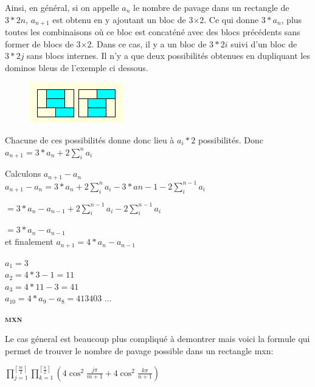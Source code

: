 \documentclass{article}
\begin{document}
Ainsi, en général, si on appelle $a_{n}$ le nombre de pavage dans un rectangle de $3*2n$, $a_{n+1}$ est obtenu en y ajoutant un bloc de 3×2.
Ce qui donne $3*a_{n}$, plus toutes les combinaisons où ce bloc est concaténé avec des blocs précédents sans former de blocs de 3×2.
Dans ce cas, il y a un bloc de $3*2i$ suivi d'un bloc de $3*2j$ sans blocs internes. Il n'y a que deux possibilités obtenues en dupliquant les dominos bleus de l'exemple ci dessous.

\begin{figure} [!h]
    \center
    \includegraphics [scale=0.7] {image/pavage-3x6_bleu.png}
\end{figure}

Chacune de ces possibilités donne donc lieu à $a_{i}*2$ possibilités.
Donc $a_{n+1} = 3*a_{n} + 2\sum_{i}^{n}a_{i}$

\hspace{1cm}

Calculons $a_{n+1} - a_{n}$
\\$a_{n+1} - a_{n}   = 3*a_{n} + 2\sum_{i}^{n}a_{i} - 3*an-1 - 2\sum_{i}^{n-1}a_{i}$


$= 3*a_{n} - a_{n-1} + 2\sum_{i}^{n-1}a_{i} - 2\sum_{i}^{n-1}a_{i}$


$= 3*a_{n} - a_{n-1}$ \\et finalement $a_{n+1} = 4*a_{n} - a_{n-1}$

    \hspace{1cm}

    \noindent$a_{1} = 3$
    \\$a_{2} = 4*3 - 1 = 11$
\\$a_{3} = 4*11 - 3 = 41$
    \\$a_{10} = 4*a_{9} - a_{8} = 413403$ ...


\hspace{2cm}

\textbf{\textsc{mxn}}

Le cas géneral est beaucoup plus compliqué à demontrer mais voici la formule qui permet de trouver le nombre de pavage possible dans un rectangle mxn:

\begin{center}
    $\prod_{j=1}^{\left \lceil \frac{m}{2} \right \rceil} \prod_{k=1}^{\left \lceil \frac{n}{2} \right \rceil}\left ( 4\cos^{2}\frac{j\pi }{m+1}+4\cos^{2}\frac{k\pi }{n+1} \right )$
\end{center}
\end{document}
